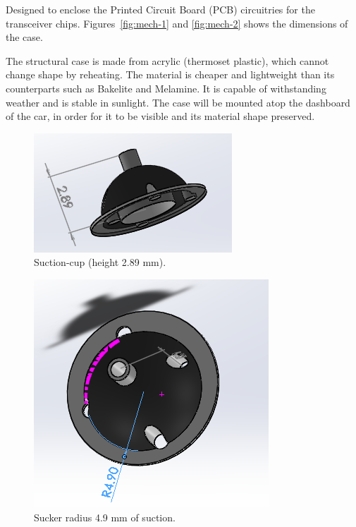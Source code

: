 Designed to enclose the Printed Circuit Board (PCB) circuitries for the transceiver chips. Figures~\ref{fig:mech-1} and \ref{fig:mech-2} shows the dimensions of the case.

The structural case is made from acrylic (thermoset plastic), which cannot change shape by reheating. The material is cheaper and lightweight than its counterparts such as Bakelite and Melamine.\cite{mech-1} It is capable of withstanding weather and is stable in sunlight. The case will be mounted atop the dashboard of the car, in order for it to be visible and its material shape preserved.

\newpage
{}
\begin{figure}[H]
\begin{center}
\includegraphics[scale=1]{data/mechanical/3.png}
\caption{Suction-cup (height 2.89 mm).}
\label{fig:mech-3}
\end{center}
\end{figure}

\begin{figure}[H]
\begin{center}
\includegraphics[scale=1]{data/mechanical/4.png}
\caption{Sucker radius 4.9 mm of suction.}
\label{fig:mech-4}
\end{center}
\end{figure}

